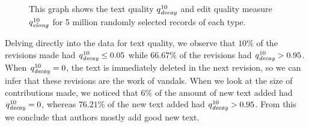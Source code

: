 \begin{figure}[tbhp]
    \begin{center}
    \end{center}
    \caption[Measuring edit and text quality over revisions]{
    	This graph shows the text quality $\quality{decay}{10}{}$
        and edit quality measure $\quality{elong}{10}{}$
	for 5 million randomly selected records of each type.
    }
    \label{fig-revs-quality}
\end{figure}

Delving directly into the data for text quality, we observe
that $10\%$ of the revisions made had 
$\quality{decay}{10}{} \le 0.05$ while $66.67\%$ of the revisions had
$\quality{decay}{10}{} > 0.95$.
When $\quality{decay}{10}{} = 0$, the text is immediately deleted
in the next revision, so we can infer that these revisions
are the work of vandals.
When we look at the size of contributions made, we noticed that
$6\%$ of the amount of new text added had $\quality{decay}{10}{} = 0$,
whereas $76.21\%$ of the new text added had $\quality{decay}{10}{} > 0.95$.
From this we conclude that authors mostly add good new text.

